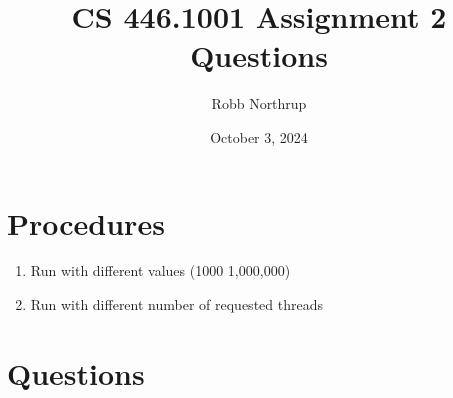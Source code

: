 \documentclass{article}
\title{CS 446.1001 Assignment 2 Questions}
\author{Robb Northrup}
\date{October 3, 2024}
\begin{document}
\maketitle

\section{Procedures}
\begin{enumerate}
    \item Run with different values (1000 1,000,000)
    \item Run with different number of requested threads
\end{enumerate}

\section{Questions}
\end{document}
